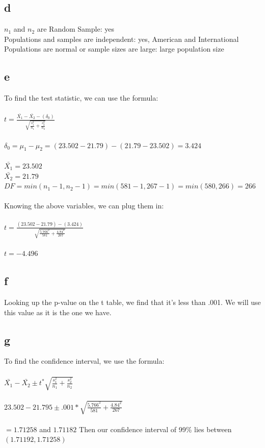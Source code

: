 \documentclass[10pt,letterpaper]{article}
\begin{document}
\subsection*{d}
$n_1$ and $n_2$ are Random Sample: yes\\
Populations and samples are independent: yes, American and International \\
Populations are normal or sample sizes are large: large population size  

\subsection*{e}
To find the test statistic, we can use the formula:\\\\
$t=\frac{\bar{X_1}-\bar{X_2}-(\delta_0)}{\sqrt{\frac{s_1^2}{n_1}+\frac{s_2^2}{n_2}}}$\\\\
$\delta_0=\mu_1 - \mu_2 = (23.502-21.79)-(21.79-23.502)=3.424$\\\\
$\bar{X_1}=23.502$\\
$\bar{X_2}=21.79$\\
$DF=min(n_1 - 1, n_2 - 1)=min(581-1, 267-1)=min(580,266)=266$\\\\
Knowing the above variables, we can plug them in:\\\\
$t=\frac{(23.502-21.79)-(3.424)}{\sqrt{\frac{5.766^2}{581}+\frac{4.84^2}{267}}}$\\\\
$t=-4.496$

\subsection*{f}
Looking up the p-value on the t table, we find that it's less than .001. We
will use this value as it is the one we have.

\subsection*{g}
To find the confidence interval, we use the formula:\\\\
$\bar{X_1}-\bar{X_2}\pm t^*\sqrt{\frac{s_1^2}{n_1}+\frac{s_2^2}{n_2}}$\\\\
$23.502-21.795 \pm .001 * \sqrt{\frac{5.766^2}{581}+\frac{4.84^2}{267}}$\\\\
$=1.71258$ and $1.71182$
Then our confidence interval of 99\% lies between $(1.71192,1.71258)$
\end{document}
